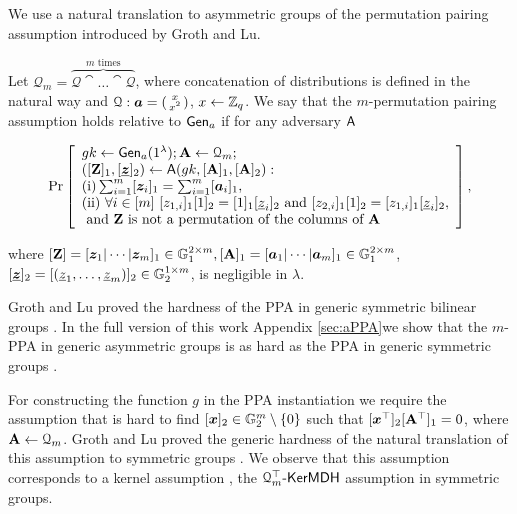 
We use a natural translation to asymmetric groups of the permutation pairing assumption introduced by Groth and Lu. 
\begin{definition}\label{def:ppa}
Let $\mathcal{Q}_{m}=\overbrace{\mathcal{Q}\cat\ldots\cat\mathcal{Q}}^{m\text{ times}}$, where concatenation of  distributions is defined in the natural way and $\mathcal{Q}: {\boldsymbol{a}}=\left(\begin{smallmatrix}x\\x^2\end{smallmatrix}\right)$, $x\gets\mathbb{Z}_q$.
We say that the $m$-permutation pairing assumption holds relative to $\mathsf{Gen}_a$ if for any adversary $\mathsf{A}$
\begin{small}$$
\Pr\left[
\begin{array}{l}
	gk\gets\mathsf{Gen}_a(1^\lambda);\mathbf{{A}}\gets\mathcal{Q}_{m};\\
	([\mathbf{{Z}}]_1,[\underline{{\boldsymbol{z}}}]_2)\gets\mathsf{A}(gk,[\mathbf{{A}}]_1,[\mathbf{{A}}]_2):\\
	\mathrm{(i)} \sum_{i=1}^m[{\boldsymbol{z}}_i]_1 = \sum_{i=1}^m[{\boldsymbol{a}}_i]_1,\\
	\mathrm{(ii)}\ \forall i\in [m] \ [z_{1,i}]_1[1]_2=[1]_1[\underline{z}_{i}]_2 \text{ and } [z_{2,i}]_1[1]_2=[z_{1,i}]_1[\underline{z}_{i}]_2,\\
	\text{ and }\mathbf{{Z}}\text{ is not a permutation of the columns of }\mathbf{{A}}
\end{array}
\right],
$$\end{small}
where $[\mathbf{{Z}}]=[{\boldsymbol{z}}_1|\cdots|{\boldsymbol{z}}_m]_1\in\mathbb{G}_1^{2\times m}, [\mathbf{{A}}]_1=[{\boldsymbol{a}}_1|\cdots|{\boldsymbol{a}}_m]_1\in\mathbb{G}_1^{2\times m}$, $[\underline{{\boldsymbol{z}}}]_2=\allowbreak[(\underline{z}_1,\ldots,\allowbreak \underline{z}_m)]_2\in\mathbb{G}_2^{1\times m}$,
 is negligible in $\lambda$.
\end{definition}
Groth and Lu proved the hardness of the PPA in generic symmetric bilinear groups \cite{AC:GroLu07}. In \ifPKC the full version of this work \else Appendix \ref{sec:aPPA}\fi we show that the $m$-PPA in generic asymmetric groups is as hard as the PPA in generic symmetric groups \ifPKC\cite{EPRINT:Gon17}\fi.

For constructing the function $g$ in the PPA instantiation we require the assumption that is hard to find $[{\boldsymbol{x}}]_2\in\mathbb{G}_2^m\setminus\{0\}$ such that $[{\boldsymbol{x}}^\top]_2[\mathbf{{A}}^\top]_1 = 0$, where $\mathbf{{A}}\gets\mathcal{Q}_m$. Groth and Lu proved the generic hardness of the natural translation of this assumption to symmetric groups \cite{AC:GroLu07}.
We observe that this assumption corresponds to a kernel assumption \cite{AC:MorRafVil16}, the $\mathcal{Q}_m^\top\mbox{-}\mathsf{KerMDH}$ assumption in symmetric groups.

